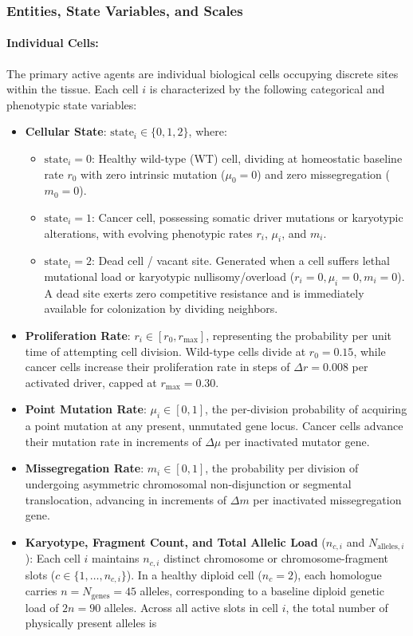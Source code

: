 \documentclass[11pt,a4paper]{article}
\begin{document}
\subsubsection{Entities, State Variables, and Scales}
\paragraph{Individual Cells:} The primary active agents are individual biological cells occupying discrete sites within the tissue. Each cell $i$ is characterized by the following categorical and phenotypic state variables:
\begin{itemize}
    \item \textbf{Cellular State}: $\text{state}_i \in \{0, 1, 2\}$, where:
    \begin{itemize}
        \item $\text{state}_i = 0$: Healthy wild-type (WT) cell, dividing at homeostatic baseline rate $r_0$ with zero intrinsic mutation ($\mu_0 = 0$) and zero missegregation ($m_0 = 0$).
        \item $\text{state}_i = 1$: Cancer cell, possessing somatic driver mutations or karyotypic alterations, with evolving phenotypic rates $r_i$, $\mu_i$, and $m_i$.
        \item $\text{state}_i = 2$: Dead cell / vacant site. Generated when a cell suffers lethal mutational load or karyotypic nullisomy/overload ($r_i = 0, \mu_i = 0, m_i = 0$). A dead site exerts zero competitive resistance and is immediately available for colonization by dividing neighbors.
    \end{itemize}
    \item \textbf{Proliferation Rate}: $r_i \in [r_0, r_{\max}]$, representing the probability per unit time of attempting cell division. Wild-type cells divide at $r_0 = 0.15$, while cancer cells increase their proliferation rate in steps of $\Delta r = 0.008$ per activated driver, capped at $r_{\max} = 0.30$.
    \item \textbf{Point Mutation Rate}: $\mu_i \in [0, 1]$, the per-division probability of acquiring a point mutation at any present, unmutated gene locus. Cancer cells advance their mutation rate in increments of $\Delta\mu$ per inactivated mutator gene.
    \item \textbf{Missegregation Rate}: $m_i \in [0, 1]$, the probability per division of undergoing asymmetric chromosomal non-disjunction or segmental translocation, advancing in increments of $\Delta m$ per inactivated missegregation gene.
    \item \textbf{Karyotype, Fragment Count, and Total Allelic Load} ($n_{c, i}$ and $N_{\text{alleles}, i}$): Each cell $i$ maintains $n_{c, i}$ distinct chromosome or chromosome-fragment slots ($c \in \{1, \dots, n_{c, i}\}$). In a healthy diploid cell ($n_c = 2$), each homologue carries $n = N_{\text{genes}} = 45$ alleles, corresponding to a baseline diploid genetic load of $2n = 90$ alleles. Across all active slots in cell $i$, the total number of physically present alleles is

\end{itemize}
\end{document}
